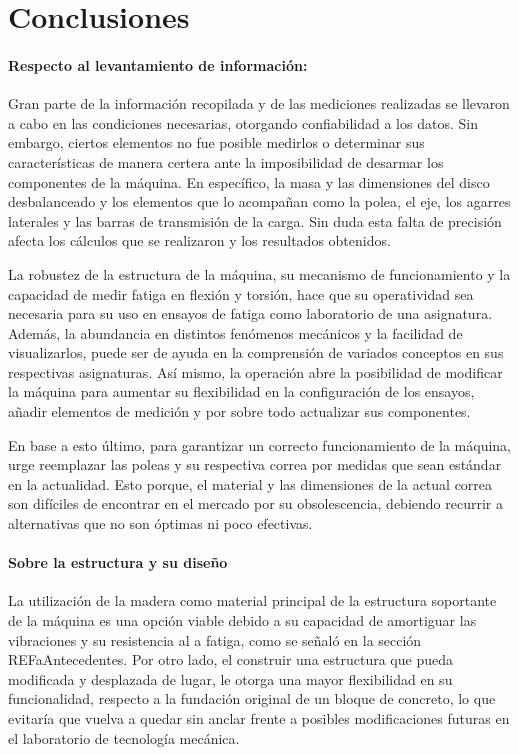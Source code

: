 \chapter{Conclusiones}

\subsubsection{Respecto al levantamiento de información:}

Gran parte de la información recopilada y de las mediciones realizadas se llevaron a cabo en las condiciones necesarias, otorgando confiabilidad a los datos. Sin embargo, ciertos elementos no fue posible medirlos o determinar sus características de manera certera ante la imposibilidad de desarmar los componentes de la máquina. En específico, la masa y las dimensiones del disco desbalanceado y los elementos que lo acompañan como la polea, el eje, los agarres laterales y las barras de transmisión de la carga. Sin duda esta falta de precisión afecta los cálculos que se realizaron y los resultados obtenidos. 

La robustez de la estructura de la máquina, su mecanismo de funcionamiento y la capacidad de medir fatiga en flexión y torsión, hace que su operatividad sea necesaria para su uso en ensayos de fatiga como laboratorio de una asignatura. Además, la abundancia en distintos fenómenos mecánicos y la facilidad de visualizarlos, puede ser de ayuda en la comprensión de variados conceptos en sus respectivas asignaturas. Así mismo, la operación abre la posibilidad de modificar la máquina para aumentar su flexibilidad en la configuración de los ensayos, añadir elementos de medición y por sobre todo actualizar sus componentes.

En base a esto último, para garantizar un correcto funcionamiento de la máquina, urge reemplazar las poleas y su respectiva correa por medidas que sean estándar en la actualidad. Esto porque, el material y las dimensiones de la actual correa son difíciles de encontrar en el mercado por su obsolescencia, debiendo recurrir a alternativas que no son óptimas ni poco efectivas. 

\subsubsection{Sobre la estructura y su diseño}

La utilización de la madera como material principal de la estructura soportante de la máquina es una opción viable debido a su capacidad de amortiguar las vibraciones y su resistencia al a fatiga, como se señaló en la sección REFaAntecedentes. Por otro lado, el construir una estructura que pueda modificada y desplazada de lugar, le otorga una mayor flexibilidad en su funcionalidad, respecto a la fundación original de un bloque de concreto, lo que evitaría que vuelva a quedar sin anclar frente a posibles modificaciones futuras en el laboratorio de tecnología mecánica. 

